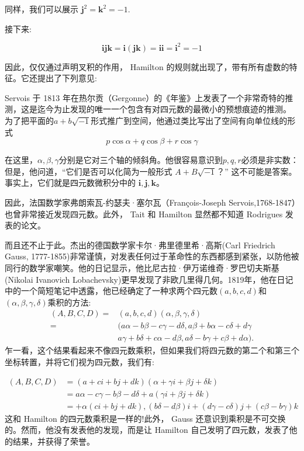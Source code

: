 同样，我们可以展示 $\mathbf{j}^{2}=\mathbf{k}^{2}=-1$.

接下来:

$$
    \mathbf{i} \mathbf{j} \mathbf{k}=\mathbf{i}(\mathbf{j} \mathbf{k})=\mathbf{i} \mathbf{i}=\mathbf{i}^{2}=-1
$$

因此，仅仅通过声明叉积的作用， Hamilton 的规则就出现了，带有所有虚数的特征。它还提出了下列意见:

\begin{CJK}{UTF8}{gkai}
    Servois 于 1813 年在热尔贡（Gergonne）的《年鉴》上发表了一个非常奇特的推测，这是迄今为止发现的唯一一个包含有对四元数的最微小的预想痕迹的推测。 为了把平面的$a+b \sqrt{-1}$形式推广到空间，他通过类比写出了空间有向单位线的形式
    $$
        p \cos \alpha+q \cos \beta+r \cos \gamma
    $$

    在这里，$\alpha, \beta, \gamma$分别是它对三个轴的倾斜角。他很容易意识到$p, q, r$必须是非实数：但是，他问道，“它们是否可以化简为一般形式 $A+B\sqrt{-1}$？” 这不可能是答案。事实上，它们就是四元数微积分中的 $\mathbf{i}, \mathbf{j}, \mathbf{k}$。\cite{bib6-4}

\end{CJK}

因此，法国数学家弗朗索瓦-约瑟夫·塞尔瓦（François-Joseph Servois,1768-1847）也曾非常接近发现四元数。此外， Tait 和 Hamilton 显然都不知道 Rodrigues 发表的论文。

而且还不止于此。杰出的德国数学家卡尔·弗里德里希·高斯(Carl Friedrich Gauss, 1777-1855)非常谨慎，对发表任何过于革命性的东西都感到紧张，以防他被同行的数学家嘲笑。他的日记显示，他比尼古拉·伊万诺维奇·罗巴切夫斯基(Nikolai Ivanovich Lobachevsky)更早发现了非欧几里得几何。1819年，他在日记中的一个简短笔记中\cite{bib6-5}透露，他已经确定了一种求两个四元数$(a, b, c, d)$和$(\alpha, \beta, \gamma, \delta)$乘积的方法:
$$
    \begin{aligned}
        (A, B, C, D)= & (a, b, c, d)(\alpha, \beta, \gamma, \delta)                               \\
        =             & (a \alpha-b \beta-c \gamma-d \delta, a \beta+b \alpha-c \delta+d \gamma   \\
                      & a \gamma+b \delta+c \alpha-d \beta, a \delta-b \gamma+c \beta+d \alpha) .
    \end{aligned}
$$
乍一看，这个结果看起来不像四元数乘积，但如果我们将四元数的第二个和第三个坐标转置，并将它们视为四元数，我们有:

$$
    \begin{aligned}
        (A, B, C, D) & =(a+c i+b j+d k)(\alpha+\gamma i+\beta j+\delta k)                                    \\
                     & =a \alpha-c \gamma-b \beta-d \delta+a(\gamma i+\beta j+\delta k)                      \\
                     & =+\alpha(c i+b j+d k),(b \delta-d \beta) i+(d \gamma-c \delta) j+(c \beta-b \gamma) k
    \end{aligned}
$$
这和 Hamilton 的四元数乘积是一样的!此外， Gauss 还意识到乘积是不可交换的。然而，他没有发表他的发现，而是让 Hamilton 自己发明了四元数，发表了他的结果，并获得了荣誉。

